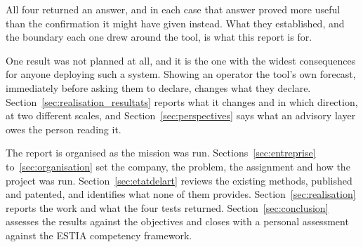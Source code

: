 All four returned an answer, and in each case that answer proved more useful than the
confirmation it might have given instead. What they established, and the boundary each one
drew around the tool, is what this report is for.

One result was not planned at all, and it is the one with the widest consequences for anyone
deploying such a system. Showing an operator the tool's own forecast, immediately before
asking them to declare, changes what they declare.
Section~\ref{sec:realisation_resultats} reports what it changes and in which direction, at two
different scales, and Section~\ref{sec:perspectives} says what an advisory layer owes the
person reading it.

The report is organised as the mission was run. Sections~\ref{sec:entreprise}
to~\ref{sec:organisation} set the company, the problem, the assignment and how the project was
run. Section~\ref{sec:etatdelart} reviews the existing methods, published and patented, and
identifies what none of them provides. Section~\ref{sec:realisation} reports the work and what
the four tests returned. Section~\ref{sec:conclusion} assesses the results against the
objectives and closes with a personal assessment against the ESTIA competency framework.
